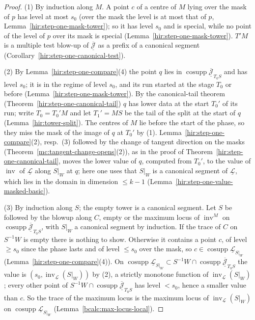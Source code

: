 \begin{proof}
\leanok
(1) By induction along \(M\). A point \(c\) of a centre of \(M\) lying over the mask of \(p\) has level at most \(s_0\) (over the mask the level is at most that of
\(p\), Lemma~\ref{hir:step-one-mask-tower}); so it has level \(s_0\) and is special, while no point of the level of \(p\) over its mask is special
(Lemma~\ref{hir:step-one-mask-tower}). \(T'M\) is a multiple test blow-up of \(\overline{\underline{\mathcal J}}\) as a prefix of a canonical segment (Corollary~\ref{hir:step-one-canonical-test}).

(2) By Lemma~\ref{hir:step-one-compare}(4) the point \(q\) lies in \(\operatorname{cosupp}\overline{\underline{\mathcal J}}_{T_0S}\) and has level \(s_0\); it is in the regime of
level \(s_0\), and its run started at the stage \(T_0\) or before (Lemma~\ref{hir:step-one-mask-tower}). By the canonical-tail theorem (Theorem~\ref{hir:step-one-canonical-tail})
\(q\) has lower data at the start \(T_0'\) of its run; write \(T_0=T_0'M\) and let \(T_1'=MS\) be the tail of the split at the start of \(q\) (Lemma~\ref{hir:tower-split}). The
centres of \(M\) lie before the start of the phase, so they miss the mask of the image of \(q\) at \(T_0'\) by (1). Lemma~\ref{hir:step-one-compare}(2), resp.\ (3) followed by the change of
tangent direction on the masks (Theorem~\ref{mc:tangent-change-opens}(2)), as in the proof of Theorem~\ref{hir:step-one-canonical-tail}, moves the lower value of \(q\), computed from \(T_0'\), to the value of
\(\operatorname{inv}\) of \(\underline{\mathcal L}\) along \(S|_W\) at \(q\); here one uses that \(S|_W\) is a canonical segment of \(\underline{\mathcal L}\), which lies in the domain
in dimension \(\le k-1\) (Lemma~\ref{hir:step-one-value-masked-basic}).

(3) By induction along \(S\); the empty tower is a canonical segment. Let \(S\) be followed by the blowup along \(C\), empty or the maximum locus of \(\operatorname{inv}^M\) on
\(\operatorname{cosupp}\overline{\underline{\mathcal J}}_{T_0S}\), with \(S|_W\) a canonical segment by induction. If the trace of \(C\) on \(S^{-1}W\) is empty there is nothing to show.
Otherwise it contains a point \(c\), of level \(\ge s_0\) since the phase lasts and of level \(\le s_0\) over the mask, so \(c\in\operatorname{cosupp}\underline{\mathcal L}_{S|_W}\)
(Lemma~\ref{hir:step-one-compare}(4)). On \(\operatorname{cosupp}\underline{\mathcal L}_{S|_W}\subset S^{-1}W\cap\operatorname{cosupp}\overline{\underline{\mathcal J}}_{T_0S}\) the value is
\((s_0,\operatorname{inv}_{\underline{\mathcal L}}(S|_W))\) by (2), a strictly monotone function of \(\operatorname{inv}_{\underline{\mathcal L}}(S|_W)\); every other point of
\(S^{-1}W\cap\operatorname{cosupp}\overline{\underline{\mathcal J}}_{T_0S}\) has level \(<s_0\), hence a smaller value than \(c\). So the trace of the maximum locus is the maximum locus of
\(\operatorname{inv}_{\underline{\mathcal L}}(S|_W)\) on \(\operatorname{cosupp}\underline{\mathcal L}_{S|_W}\) (Lemma~\ref{bcalc:max-locus-local}).


\end{proof}
